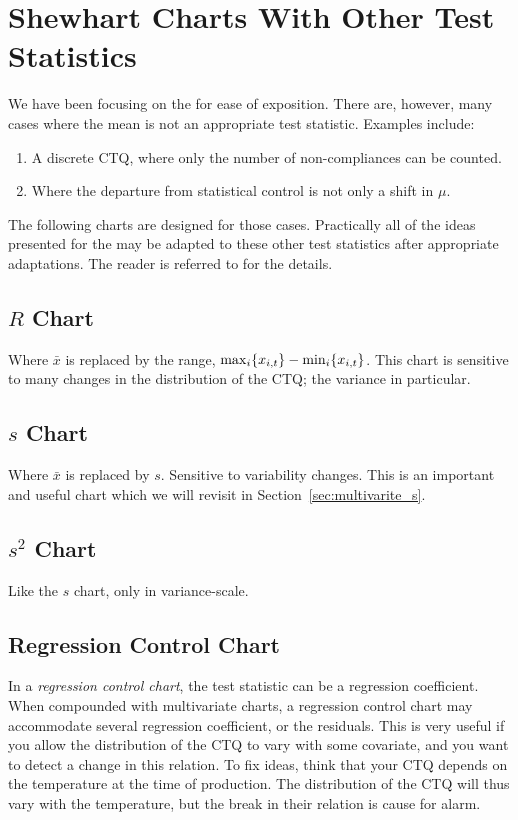 \section{Shewhart Charts With Other Test Statistics}

We have been focusing on the \barxChart for ease of exposition. There are, however, many cases where the mean is not an appropriate test statistic.
Examples include:
\begin{enumerate}
\item A discrete CTQ, where only the number of non-compliances can be counted. 
\item Where the departure from statistical control is not only a shift in $\mu$. 
\end{enumerate}

The following charts are designed for those cases. 
Practically all of the ideas presented for the \barxChart may be adapted to these other test statistics after appropriate adaptations. 
The reader is referred to \cite{montgomery_introduction_2007} for the details. 

\label{sec:other_control_charts}
\subsection{$R$ Chart}
Where $\bar{x}$ is replaced by the range, $\max_i\{ x_{i,t} \}-\min_i\{ x_{i,t} \}$.
This chart is sensitive to many changes in the distribution of the CTQ; the variance in particular. 
\subsection{$s$ Chart}
Where $\bar{x}$ is replaced by $s$. 
Sensitive to variability changes. 
This is an important and useful chart which we will revisit in Section~\ref{sec:multivarite_s}.
\subsection{$s^2$ Chart}
Like the $s$ chart, only in variance-scale.
\subsection{Regression Control Chart}
In a \emph{regression control chart}, the test statistic can be a regression coefficient. 
When compounded with multivariate charts, a regression control chart may accommodate several regression  coefficient, or the residuals. 
This is very useful if you allow the distribution of the CTQ to vary with some covariate, and you want to detect a change in this relation. 
To fix ideas, think that your CTQ depends on the temperature at the time of production. The distribution of the CTQ will thus vary with the temperature, but the break in their relation is cause for alarm.
